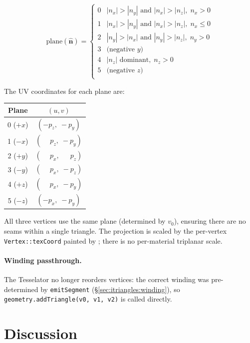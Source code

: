 \documentclass[10pt,a4paper]{article}
\begin{document}
\[
  \text{plane}(\hat{\mathbf{n}}) =
  \begin{cases}
    0 & |n_x| > |n_y| \text{ and } |n_x| > |n_z|, \; n_x > 0\\
    1 & |n_x| > |n_y| \text{ and } |n_x| > |n_z|, \; n_x \leq 0\\
    2 & |n_y| > |n_x| \text{ and } |n_y| > |n_z|, \; n_y > 0\\
    3 & \text{(negative } y\text{)}\\
    4 & |n_z|\text{ dominant}, \; n_z > 0\\
    5 & \text{(negative } z\text{)}\\
  \end{cases}
\]

The UV coordinates for each plane are:
\begin{center}
\begin{tabular}{c|c}
  \toprule
  Plane & $(u, v)$ \\
  \midrule
  0 ($+x$) & $(-p_z,\; -p_y)$ \\
  1 ($-x$) & $(\phantom{-}p_z,\; -p_y)$ \\
  2 ($+y$) & $(\phantom{-}p_x,\; \phantom{-}p_z)$ \\
  3 ($-y$) & $(\phantom{-}p_x,\; -p_z)$ \\
  4 ($+z$) & $(\phantom{-}p_x,\; -p_y)$ \\
  5 ($-z$) & $(-p_x,\; -p_y)$ \\
  \bottomrule
\end{tabular}
\end{center}
All three vertices use the same plane (determined by $v_0$), ensuring
there are no seams within a single triangle.  The projection is scaled by the
per-vertex \lstinline{Vertex::texCoord} painted by ;
there is no per-material triplanar scale.

\paragraph{Winding passthrough.}
The Tesselator no longer reorders vertices: the correct winding was
pre-determined by \lstinline{emitSegment} (\S\ref{sec:itriangles:winding}),
so \lstinline{geometry.addTriangle(v0, v1, v2)} is called directly.

\section{Discussion}
\label{sec:discussion}
\end{document}
